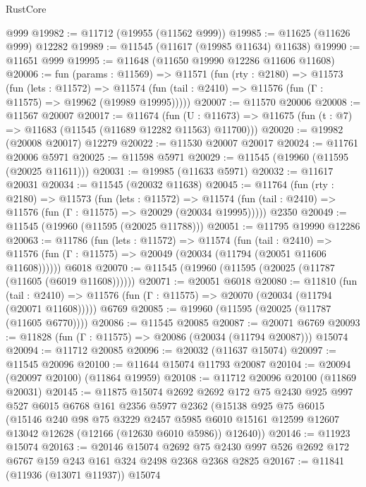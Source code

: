 \begin{lexlean}{RustCore}
\begin{coremodule}
    @999
@19982 := @11712 (@19955 (@11562 @999))
@19985 := @11625 (@11626 @999) @12282
@19989 := @11545 (@11617 (@19985 @11634) @11638)
@19990 := @11651 @999
@19995 := @11648 (@11650 @19990 @12286 @11606 @11608)
@20006 := fun (params : @11569) =>
  @11571
    (fun (rty : @2180) =>
    @11573
      (fun (lets : @11572) =>
      @11574 (fun (tail : @2410) => @11576 (fun (Γ : @11575) => @19962 (@19989 @19995)))))
@20007 := @11570 @20006
@20008 := @11567 @20007
@20017 := @11674
    (fun (U : @11673) => @11675 (fun (t : @7) => @11683 (@11545 (@11689 @12282 @11563) @11700)))
@20020 := @19982 (@20008 @20017) @12279
@20022 := @11530 @20007 @20017
@20024 := @11761 @20006 @5971
@20025 := @11598 @5971
@20029 := @11545 (@19960 (@11595 (@20025 @11611)))
@20031 := @19985 (@11633 @5971)
@20032 := @11617 @20031
@20034 := @11545 (@20032 @11638)
@20045 := @11764
    (fun (rty : @2180) =>
    @11573
      (fun (lets : @11572) =>
      @11574 (fun (tail : @2410) => @11576 (fun (Γ : @11575) => @20029 (@20034 @19995)))))
    @2350
@20049 := @11545 (@19960 (@11595 (@20025 @11788)))
@20051 := @11795 @19990 @12286
@20063 := @11786
    (fun (lets : @11572) =>
    @11574
      (fun (tail : @2410) =>
      @11576 (fun (Γ : @11575) => @20049 (@20034 (@11794 (@20051 @11606 @11608))))))
    @6018
@20070 := @11545 (@19960 (@11595 (@20025 (@11787 (@11605 (@6019 @11608))))))
@20071 := @20051 @6018
@20080 := @11810
    (fun (tail : @2410) => @11576 (fun (Γ : @11575) => @20070 (@20034 (@11794 (@20071 @11608)))))
    @6769
@20085 := @19960 (@11595 (@20025 (@11787 (@11605 @6770))))
@20086 := @11545 @20085
@20087 := @20071 @6769
@20093 := @11828 (fun (Γ : @11575) => @20086 (@20034 (@11794 @20087))) @15074
@20094 := @11712 @20085
@20096 := @20032 (@11637 @15074)
@20097 := @11545 @20096
@20100 := @11644 @15074 @11793 @20087
@20104 := @20094 (@20097 @20100) (@11864 @19959)
@20108 := @11712 @20096 @20100 (@11869 @20031)
@20145 := @11875
    @15074
    @2692
    @2692
    @172
    @75
    @2430
    @925
    @997
    @527
    @6015
    @6768
    @161
    @2356
    @5977
    @2362
    (@15138
      @925
      @75
      @6015
      (@15146
        @240
        @98
        @75
        @3229
        @2457
        @5985
        @6010
        @15161
        @12599
        @12607
        @13042
        @12628
        (@12166 (@12630 @6010 @5986))
        @12640))
@20146 := @11923 @15074
@20163 := @20146
    @15074
    @2692
    @75
    @2430
    @997
    @526
    @2692
    @172
    @6767
    @159
    @243
    @161
    @324
    @2498
    @2368
    @2368
    @2825
@20167 := @11841 (@11936 (@13071 @11937)) @15074

\end{coremodule}
\end{lexlean}
